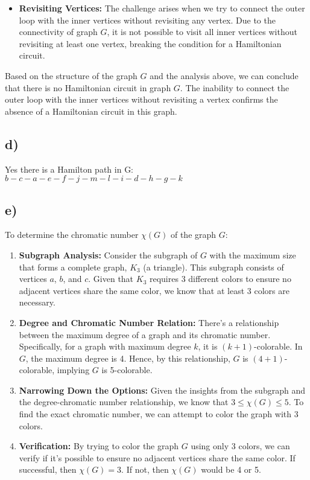 \documentclass[12pt]{article}
\begin{document}
\begin{itemize}
    \item \textbf{Revisiting Vertices:} The challenge arises when we try to connect the outer loop with the inner vertices without revisiting any vertex. Due to the connectivity of graph \( G \), it is not possible to visit all inner vertices without revisiting at least one vertex, breaking the condition for a Hamiltonian circuit.
\end{itemize}

Based on the structure of the graph \( G \) and the analysis above, we can conclude that there is no Hamiltonian circuit in graph \( G \). The inability to connect the outer loop with the inner vertices without revisiting a vertex confirms the absence of a Hamiltonian circuit in this graph.


\subsection*{d)}

Yes there is a Hamilton path in G: \(  b - c - a - e - f - j - m - l - i-d-h-g-k \)

\subsection*{e)}

To determine the chromatic number \( \chi(G) \) of the graph \( G \):

\begin{enumerate}
    \item \textbf{Subgraph Analysis:} Consider the subgraph of \( G \) with the maximum size that forms a complete graph, \( K_3 \) (a triangle). This subgraph consists of vertices \( a \), \( b \), and \( c \). Given that \( K_3 \) requires 3 different colors to ensure no adjacent vertices share the same color, we know that at least 3 colors are necessary.
    
    \item \textbf{Degree and Chromatic Number Relation:} There's a relationship between the maximum degree of a graph and its chromatic number. Specifically, for a graph with maximum degree \( k \), it is \( (k+1) \)-colorable. In \( G \), the maximum degree is 4. Hence, by this relationship, \( G \) is \( (4+1) \)-colorable, implying \( G \) is 5-colorable.
    
    \item \textbf{Narrowing Down the Options:} Given the insights from the subgraph and the degree-chromatic number relationship, we know that \( 3 \leq \chi(G) \leq 5 \). To find the exact chromatic number, we can attempt to color the graph with 3 colors.
    
    \item \textbf{Verification:} By trying to color the graph \( G \) using only 3 colors, we can verify if it's possible to ensure no adjacent vertices share the same color. If successful, then \( \chi(G) = 3 \). If not, then \( \chi(G) \) would be 4 or 5.
\end{enumerate}
\end{document}
